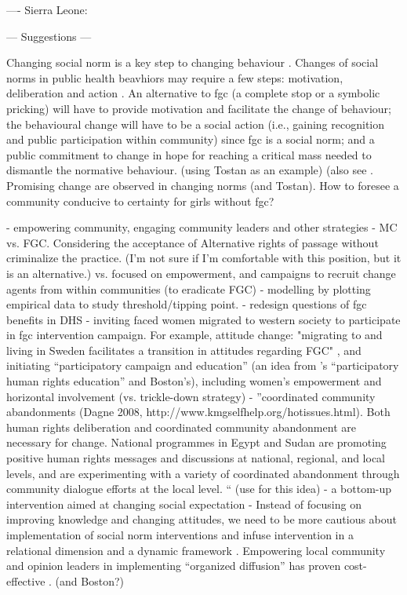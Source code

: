 \documentclass[12pt,]{article}
\begin{document}
---- Sierra Leone: 
\cite{Sagn14}  

— Suggestions —

Changing social norm is a key step to changing behaviour  .  Changes of social norms in public health beavhiors may require a few steps:  motivation, deliberation and action \cite{CislHeis18a}.  An alternative to fgc (a complete stop or a symbolic pricking) will have to provide motivation and facilitate the change of behaviour; the behavioural change will have to be a social action (i.e., gaining recognition and public participation within community) since fgc is a social norm;  and a public commitment to change in hope for reaching a critical mass needed to dismantle the normative behaviour. (using Tostan as an example) (also see \cite{Youn15}.  Promising change are observed in changing norms \cite{EvanSnid19} (and Tostan).  How to foresee a community conducive to certainty for girls without fgc?


- empowering community, engaging community leaders and other strategies \cite{BergDeni13b}
- MC vs. FGC.  Considering the acceptance of Alternative rights of passage \cite{GaluKama15} without criminalize the practice. (I'm not sure if I'm comfortable with this position, but it is an alternative.) vs. focused on empowerment, and campaigns to recruit change agents from within communities (to eradicate FGC) \cite{ShelHern13, Will18}
- modelling by plotting empirical data to study threshold/tipping point.
- redesign questions of fgc benefits in DHS
- inviting faced women migrated to western society to participate in fgc intervention campaign.  For example,  attitude change: "migrating to and living in Sweden facilitates a transition in attitudes regarding FGC" \cite{WahlJohn17}, and initiating “participatory campaign and education”  (an idea from ’s “participatory human rights education” and Boston’s), including women’s empowerment and horizontal involvement (vs. trickle-down strategy)
- \cite{MackLeJe08}”coordinated community abandonments (Dagne 2008, http://www.kmgselfhelp.org/hotissues.html). Both human rights deliberation and coordinated community abandonment are necessary for change. National programmes in Egypt and Sudan are promoting positive human rights messages and discussions at national, regional, and local levels, and are experimenting with a variety of coordinated abandonment through community dialogue efforts at the local level. “ (use \cite{Dagn09, MackLeJe08} for this idea)
- a bottom-up intervention aimed at changing social expectation \cite{BiccMari15}
- Instead of focusing on improving knowledge and changing attitudes, we need to be more cautious about implementation of social norm interventions and infuse intervention in a relational dimension and a dynamic framework \cite{CislHeis18a, CislHeis18b, McCh15}.  Empowering local community and opinion leaders in implementing “organized diffusion” \cite{MackLeJe08}has proven cost-effective \cite{CislDenn19}. (and Boston?)
\end{document}
